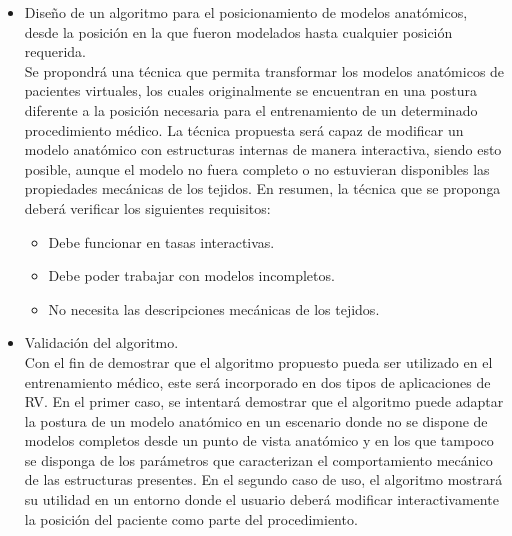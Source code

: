 \begin{itemize}
\item Diseño de un algoritmo para el posicionamiento de modelos anatómicos, desde la posición en la que fueron modelados hasta cualquier posición requerida.
\\

Se propondrá una técnica que permita transformar los modelos anatómicos de pacientes virtuales, los cuales originalmente se encuentran en una postura diferente a la posición necesaria para el entrenamiento de un determinado procedimiento médico. %
La técnica propuesta será capaz de modificar un modelo anatómico con estructuras internas de manera interactiva, siendo esto posible, aunque el modelo no fuera completo o no estuvieran disponibles las propiedades mecánicas de los tejidos. En resumen, la técnica que se proponga deberá verificar los siguientes requisitos:

\begin{itemize}
    \item Debe funcionar en tasas interactivas.
    \item Debe poder trabajar con modelos incompletos.
    \item No necesita las descripciones mecánicas de los tejidos.
    
\end{itemize}


\item 	Validación del algoritmo. \\
Con el fin de demostrar que el algoritmo propuesto pueda ser utilizado en el entrenamiento médico, este será incorporado en dos tipos de aplicaciones de \ac{RV}. En el primer caso, se intentará demostrar que el algoritmo puede adaptar la postura de un modelo anatómico en un escenario donde no se dispone de modelos completos desde un punto de vista anatómico y en los que tampoco se disponga de los parámetros que caracterizan el comportamiento mecánico de las estructuras presentes. En el segundo caso de uso, el algoritmo mostrará su utilidad en un entorno donde el usuario deberá modificar interactivamente la posición del paciente como parte del procedimiento. 


\end{itemize}
